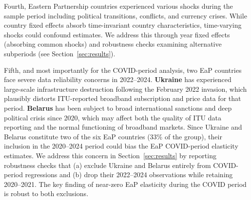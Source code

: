 Fourth, Eastern Partnership countries experienced various shocks during the sample period including political transitions, conflicts, and currency crises. While country fixed effects absorb time-invariant country characteristics, time-varying shocks could confound estimates. We address this through year fixed effects (absorbing common shocks) and robustness checks examining alternative subperiods (see Section~\ref{sec:results}).

Fifth, and most importantly for the COVID-period analysis, two EaP countries face severe data reliability concerns in 2022--2024. \textbf{Ukraine} has experienced large-scale infrastructure destruction following the February 2022 invasion, which plausibly distorts ITU-reported broadband subscription and price data for that period. \textbf{Belarus} has been subject to broad international sanctions and deep political crisis since 2020, which may affect both the quality of ITU data reporting and the normal functioning of broadband markets. Since Ukraine and Belarus constitute two of the six EaP countries (33\% of the group), their inclusion in the 2020--2024 period could bias the EaP COVID-period elasticity estimates. We address this concern in Section~\ref{sec:results} by reporting robustness checks that (a) exclude Ukraine and Belarus entirely from COVID-period regressions and (b) drop their 2022--2024 observations while retaining 2020--2021. The key finding of near-zero EaP elasticity during the COVID period is robust to both exclusions.



